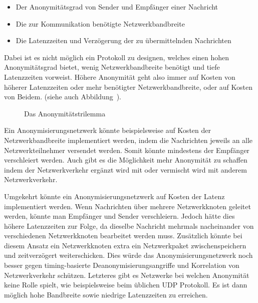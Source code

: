 \begin{itemize}
    \item Der Anonymitätsgrad von Sender und Empfänger einer Nachricht
    \item Die zur Kommunikation benötigte Netzwerkbandbreite
    \item Die Latenzzeiten und Verzögerung der zu übermittelnden Nachrichten
\end{itemize}

Dabei ist es nicht möglich ein Protokoll zu designen, welches einen hohen Anonymitätsgrad bietet, wenig Netzwerkbandbreite benötigt und tiefe Latenzzeiten vorweist. \parencite[S.~1]{das_anonymity_2018}
Höhere Anonymität geht also immer auf Kosten von höherer Latenzzeiten oder mehr benötigter Netzwerkbandbreite, oder auf Kosten von Beidem. 
(siehe auch Abbildung~).

\begin{figure}[H]
    \centering
    \caption{Das Anonymitätstrilemma}\label{fig:anonimitytrilemma}
\end{figure}

Ein Anonymisierungsnetzwerk könnte beispielsweise auf Kosten der Netzwerkbandbreite implementiert werden, indem die Nachrichten jeweils an alle Netzwerkteilnehmer versendet werden.  Somit könnte mindestens der Empfänger verschleiert werden.
Auch gibt es die Möglichkeit mehr Anonymität zu schaffen indem der Netzwerkverkehr ergänzt wird mit oder vermischt wird mit anderem Netzwerkverkehr.

Umgekehrt könnte ein Anonymisierungsnetzwerk auf Kosten der Latenz implementiert werden. Wenn Nachrichten über mehrere Netzwerkknoten geleitet werden, könnte man Empfänger und Sender verschleiern.
Jedoch hätte dies höhere Latenzzeiten zur Folge, da dieselbe Nachricht mehrmals nacheinander von verschiedenen Netzwerkknoten bearbeitet werden muss.
Zusätzlich könnte bei diesem Ansatz ein Netzwerkknoten extra ein Netzwerkpaket zwischenspeichern und zeitverzögert weiterschicken.
Dies würde das Anonymisierungsnetzwerk noch besser gegen timing-basierte Deanonymisierungsangriffe und Korrelation von Netzwerkverkehr schützen.
Letzteres gibt es Netzwerke bei welchen Anonymität keine Rolle spielt, wie beispielsweise beim üblichen UDP Protokoll. Es ist dann möglich hohe Bandbreite sowie niedrige Latenzzeiten zu erreichen.

